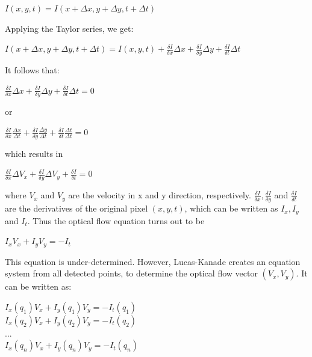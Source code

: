 \begin{center}
\large
$I(x, y, t) = I(x + \Delta x, y + \Delta y, t + \Delta t)$
\normalsize
\end{center}

Applying the Taylor series, we get:

\begin{center}
\large
$I(x + \Delta x, y + \Delta y, t + \Delta t) = I(x, y, t) + \frac{\delta I}{\delta x}\Delta x + \frac{\delta I}{\delta y}\Delta y + \frac{\delta I}{\delta t}\Delta t$
\normalsize
\end{center}

It follows that: 

\begin{center}
\large
$\frac{\delta I}{\delta x}\Delta x + \frac{\delta I}{\delta y}\Delta y + \frac{\delta I}{\delta t}\Delta t = 0$
\normalsize
\end{center}

or

\begin{center}
\large
$\frac{\delta I}{\delta x}\frac{\Delta x}{\Delta t} + \frac{\delta I}{\delta y}\frac{\Delta y}{\Delta t} + \frac{\delta I}{\delta t}\frac{\Delta t}{\Delta t} = 0$
\normalsize
\end{center}

which results in 

\begin{center}
\large
$\frac{\delta I}{\delta x}\Delta V_x + \frac{\delta I}{\delta y}\Delta V_y + \frac{\delta I}{\delta t} = 0$
\normalsize
\end{center}

where $V_x$ and $V_y$ are the velocity in x and y direction, respectively. $\frac{\delta I}{\delta x}, \frac{\delta I}{\delta y}$ and $\frac{\delta I}{\delta t}$ are the derivatives of the original pixel $(x, y, t)$, which can be written as $I_x, I_y$ and $I_t$.
Thus the optical flow equation turns out to be

\begin{center}
\large
$I_x V_x + I_y V_y = -I_t$
\normalsize
\end{center}

This equation is under-determined. However, Lucas-Kanade creates an equation system from all detected points, to determine the optical flow vector $(V_x, V_y)$. It can be written as: 

\begin{center}
\large
$I_x(q_1) V_x + I_y(q_1) V_y = -I_t(q_1)$\\
$I_x(q_2) V_x + I_y(q_2) V_y = -I_t(q_2)$\\
...\\
$I_x(q_n) V_x + I_y(q_n) V_y = -I_t(q_n)$
\normalsize
\end{center}

